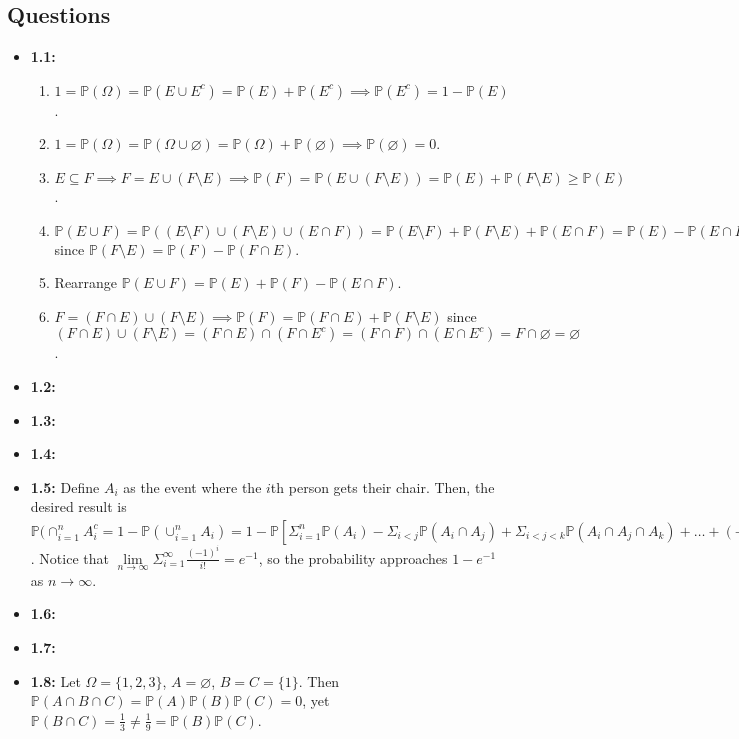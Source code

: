 \documentclass[12pt]{article}
\newcommand{\p}{\mathbb{P}}
\begin{document}
\subsection*{Questions}
\begin{itemize}
    \item \textbf{1.1:}
    \begin{enumerate}
        \item $1 = \p(\Omega) = \p(E \cup E^c) = \p(E) + \p(E^c) \implies \p(E^c) = 1 - \p(E)$.
        \item $1 = \p(\Omega) = \p(\Omega \cup \varnothing) = \p(\Omega) + \p(\varnothing) \implies \p(\varnothing) = 0$.
        \item $E \subseteq F \implies F = E \cup (F \setminus E) \implies \p(F) = \p(E \cup (F \setminus E)) = \p(E) + \p(F \setminus E) \geq \p(E)$.
        \item $\p(E \cup F) = \p((E \setminus F) \cup (F \setminus E) \cup (E \cap F)) = \p(E \setminus F) + \p(F \setminus E) + \p(E \cap F) = \p(E) - \p(E \cap F) + \p(F) - \p(E \cap F) + \p(E \cap F) = \p(E) + \p(F) - \p(E \cap F)$ since $\p(F \setminus E) = \p(F) - \p(F \cap E)$.
        \item Rearrange $\p(E \cup F) = \p(E) + \p(F) - \p(E \cap F)$.
        \item $F = (F \cap E) \cup (F \setminus E) \implies \p(F) = \p(F \cap E) + \p(F \setminus E)$ since $(F \cap E) \cup (F \setminus E) = (F \cap E) \cap (F \cap E^c) = (F \cap F) \cap (E \cap E^c) = F \cap \varnothing = \varnothing$.
    \end{enumerate}
    \item \textbf{1.2:}
    \item \textbf{1.3:}
    \item \textbf{1.4:}
    \item \textbf{1.5:} Define $A_i$ as the event where the $i$th person gets their chair. Then, the desired result is $\p(\cap_{i=1}^n A_i^c = 1 - \p(\cup_{i=1}^n A_i) = 1 - \p[\Sigma_{i=1}^n \p(A_i) - \Sigma_{i<j} \p(A_i \cap A_j) + \Sigma_{i<j<k} \p(A_i \cap A_j \cap A_k) + \ldots + (-1)^{n=1} \p(\cap_{i=1}^n A_i)] = 1 - \Sigma_{i=1}^n \frac{(-1)^i}{i!}$. Notice that $\lim \limits_{n \to \infty} \Sigma_{i=1}^\infty \frac{(-1)^i}{i!} = e^{-1}$, so the probability approaches $1 - e^{-1}$ as $n \to \infty$.
    \item \textbf{1.6:}
    \item \textbf{1.7:}
    \item \textbf{1.8:} Let $\Omega = \{1, 2, 3\}$, $A = \varnothing$, $B = C = \{1\}$. Then $\p(A \cap B \cap C) = \p(A)\p(B)\p(C) = 0$, yet $\p(B \cap C) = \frac{1}{3} \neq \frac{1}{9} = \p(B)\p(C)$.

\end{itemize}
\end{document}

